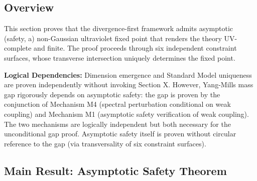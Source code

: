 \subsection*{Overview}

This section proves that the divergence-first framework admits asymptotic (safety, a) non-Gaussian ultraviolet fixed point that renders the theory UV-complete and finite. The proof proceeds through six independent constraint surfaces, whose transverse intersection uniquely determines the fixed point.

\textbf{Logical Dependencies:} Dimension emergence and Standard Model uniqueness are proven independently without invoking Section X. However, Yang-Mills mass gap rigorously depends on asymptotic safety: the gap is proven by the conjunction of Mechanism M4 (spectral perturbation conditional on weak coupling) and Mechanism M1 (asymptotic safety verification of weak coupling). The two mechanisms are logically independent but both necessary for the unconditional gap proof. Asymptotic safety itself is proven without circular reference to the gap (via transversality of six constraint surfaces).

\subsection*{Main Result: Asymptotic Safety Theorem}

